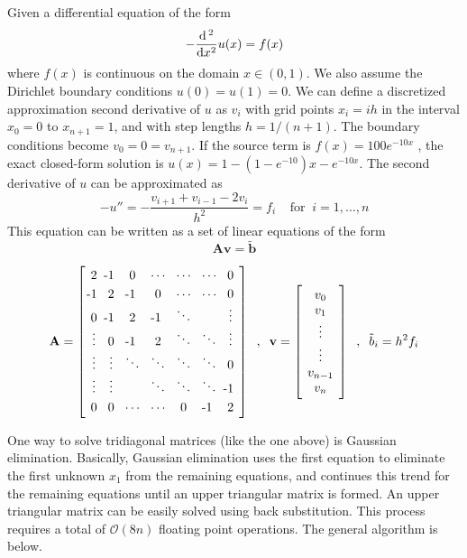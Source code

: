 \documentclass[11pt]{article}
\begin{document}
    Given a differential equation of the form 
    \begin{equation} - \dfrac{\dif\,^2}{\dif x^2} u(x) = f(x) \end{equation}
    where $f(x)$ is continuous on the domain $x \in (0,1)$. We also assume the Dirichlet boundary conditions $u(0)=u(1)=0$. We can define a discretized approximation second derivative of $u$ as $v_i$ with grid points $x_i=ih$ in the interval $x_0=0$ to $x_{n+1}=1$, and with step lengths $h=1/(n+1)$. The boundary conditions become $v_0 = 0 = v_{n+1}$. If the source term is $f(x) = 100e^{-10x}$ , the exact closed-form solution is $u(x) = 1−(1−e^{−10})x−e^{−10x}$. The second derivative of $u$ can be approximated as 
    \begin{equation} -u'' = -\dfrac{v_{i+1}+v_{i-1}-2v_i}{h^2} = f_i \;\;\;\; \text{for}\;\; i = 1,\dots,n \end{equation}
    This equation can be written as a set of linear equations of the form
    \begin{equation} \mathbf{Av} = \tilde{\mathbf{b}}  \end{equation}
    

    \[ \arraycolsep 1.0ex \mathbf{A} = \left[ \begin{array}{c c c c c c c} 
    \vspace{.1cm} 2 & \llap{-}1 & 0 & \cdots & \cdots & \cdots & 0 \\
    \llap{-}1 & 2 & \llap{-}1 & 0 & \cdots & \cdots & 0 \\
    0 & \llap{-}1 & 2 & \llap{-}1 & \ddots &  & \vdots \\
    \vdots & 0 & \llap{-}1 & 2 & \ddots & \ddots & \vdots \\
    \vdots & \vdots & \ddots &\ddots&\ddots&\ddots&0 \\
    \vdots &\vdots&&\ddots&\ddots&\ddots& \llap{-}1 \vspace{.1cm} \\ 
    0 &0&\cdots&\cdots&0&\llap{-}1& 2 
    \end{array} \right] \;\; , \;\; \bold{v} = \left[ \begin{array}{c} v_0 \\ v_1 \\ \vdots \\ \vdots \\ v_{n-1} \\ v_n \end{array} \right] \;\; , \;\; \tilde{b}_i = h^2 f_i \]

    One way to solve tridiagonal matrices (like the one above) is Gaussian elimination. Basically, Gaussian elimination uses the first equation to eliminate the first unknown $x_1$ from the remaining equations, and continues this trend for the remaining equations until an upper triangular matrix is formed. An upper triangular matrix can be easily solved using back substitution. This process requires a total of $\mathcal{O}(8n)$ floating point operations. The general algorithm is below.
    
\end{document}
